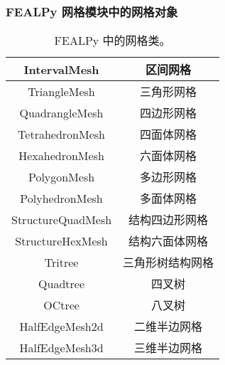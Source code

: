 \documentclass{beamer}
\numberwithin{subsection}{section}
\begin{document}
\begin{frame}
    \frametitle{FEALPy 网格模块中的网格对象}
\begin{table}[H]
    \tiny
\begin{tabular}[c]{|c|c|}\hline
        IntervalMesh      & 区间网格        \\\hline
		TriangleMesh      & 三角形网格       \\\hline
		QuadrangleMesh    & 四边形网格       \\\hline
		TetrahedronMesh   & 四面体网格       \\\hline
		HexahedronMesh    & 六面体网格       \\\hline
		PolygonMesh       & 多边形网格       \\\hline
		PolyhedronMesh    & 多面体网格       \\\hline
		StructureQuadMesh & 结构四边形网格   \\\hline
		StructureHexMesh  & 结构六面体网格   \\\hline
		Tritree           & 三角形树结构网格 \\\hline
		Quadtree          & 四叉树           \\\hline
		OCtree            & 八叉树           \\\hline
        HalfEdgeMesh2d    & 二维半边网格     \\\hline
        HalfEdgeMesh3d    & 三维半边网格     \\\hline
\end{tabular}
\caption{FEALPy 中的网格类。}
\end{table}
\end{frame}
\end{document}
